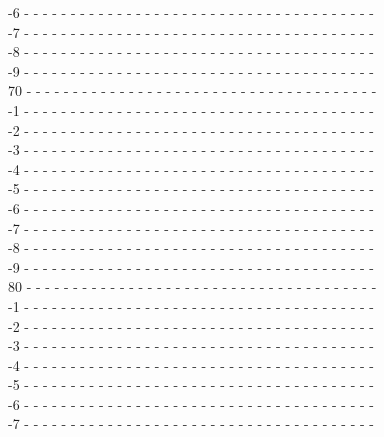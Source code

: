 \documentclass{cmspaper}
\begin{document}
{\begin{flushleft}
-6 - - - - - - - - - - - - - - - - - - - - - - - - - - - - - - - - - - - - - -\\
-7 - - - - - - - - - - - - - - - - - - - - - - - - - - - - - - - - - - - - - -\\
-8 - - - - - - - - - - - - - - - - - - - - - - - - - - - - - - - - - - - - - -\\
-9 - - - - - - - - - - - - - - - - - - - - - - - - - - - - - - - - - - - - - -\\
70 - - - - - - - - - - - - - - - - - - - - - - - - - - - - - - - - - - - - - -\\
-1 - - - - - - - - - - - - - - - - - - - - - - - - - - - - - - - - - - - - - -\\
-2 - - - - - - - - - - - - - - - - - - - - - - - - - - - - - - - - - - - - - -\\
-3 - - - - - - - - - - - - - - - - - - - - - - - - - - - - - - - - - - - - - -\\
-4 - - - - - - - - - - - - - - - - - - - - - - - - - - - - - - - - - - - - - -\\
-5 - - - - - - - - - - - - - - - - - - - - - - - - - - - - - - - - - - - - - -\\
-6 - - - - - - - - - - - - - - - - - - - - - - - - - - - - - - - - - - - - - -\\
-7 - - - - - - - - - - - - - - - - - - - - - - - - - - - - - - - - - - - - - -\\
-8 - - - - - - - - - - - - - - - - - - - - - - - - - - - - - - - - - - - - - -\\
-9 - - - - - - - - - - - - - - - - - - - - - - - - - - - - - - - - - - - - - -\\
80 - - - - - - - - - - - - - - - - - - - - - - - - - - - - - - - - - - - - - -\\
-1 - - - - - - - - - - - - - - - - - - - - - - - - - - - - - - - - - - - - - -\\
-2 - - - - - - - - - - - - - - - - - - - - - - - - - - - - - - - - - - - - - -\\
-3 - - - - - - - - - - - - - - - - - - - - - - - - - - - - - - - - - - - - - -\\
-4 - - - - - - - - - - - - - - - - - - - - - - - - - - - - - - - - - - - - - -\\
-5 - - - - - - - - - - - - - - - - - - - - - - - - - - - - - - - - - - - - - -\\
-6 - - - - - - - - - - - - - - - - - - - - - - - - - - - - - - - - - - - - - -\\
-7 - - - - - - - - - - - - - - - - - - - - - - - - - - - - - - - - - - - - - -\\

\end{flushleft}}
\end{document}
